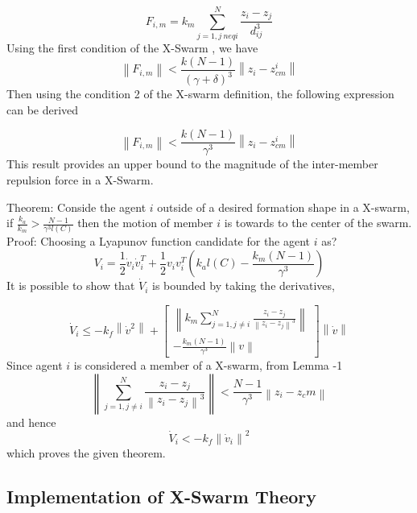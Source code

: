 \documentclass[twoside]{article}
\newcommand{\norm}[1]{\left\lVert#1\right\rVert}
\begin{document}
\begin{multicols}{2}
\begin{equation}
 F_{i,m} = k_m \sum_{j=1, j\ neq i}^{N} \frac{z_i - z_j}{d_{ij}^3} 
\end{equation}
Using the first condition of the X-Swarm , we have
\begin{equation}
 \norm{F_{i,m}} < \frac{k(N-1)}{(\gamma + \delta)^3} \norm{z_i - z_{cm}^i}
\end{equation}
Then using the condition 2 of the X-swarm definition, the following expression can be derived

\begin{equation}
 \norm{F_{i,m}} < \frac{k(N-1)}{\gamma^3} \norm{z_i - z_{cm}^i}
\end{equation}
		This result provides an upper bound to the magnitude of the inter-member repulsion force in a X-Swarm.  
		
		Theorem: Conside the agent $i$	outside of a desired formation shape in a X-swarm, if $\frac{k_a}{k_m} > \frac{N-1}{\gamma^3  l(C)}$ then the motion of member $i$ is towards to the center of the swarm. 
		Proof: Choosing a Lyapunov function candidate for the agent $i$ as?
		\begin{equation}
      V_i = \frac{1}{2} \dot{v}_i \dot{v}_i^T + \frac{1}{2} v_i v_i^T\left(k_al(C)-\frac{k_m(N-1)}{\gamma^3}\right) 
      		\end{equation}
			It is possible to show that $\dot{V}_i$ is bounded by taking the derivatives,
			
			\begin{equation}
\dot{V}_i \leq -k_f \norm{\dot{v}^2} + \begin{bmatrix}
\norm{k_m \sum_{j=1, j \neq i}^{N} \frac{z_i - z_j}{\norm{z_i - z_j}^3}} \\
- \frac{k_m(N-1)}{\gamma ^3} \norm{v}
\end{bmatrix} \norm{\dot{v}}
			\end{equation}
			Since agent $i$ is considered a member of a X-swarm, from Lemma -1
			\begin{equation}
\norm{ \sum_{j=1, j \neq i}^{N} \frac{z_i - z_j}{\norm{z_i - z_j}^3}} < \frac{N-1}{\gamma^3} \norm{z_i - z_cm}
			\end{equation}
			and hence
			\begin{equation}
\dot{V}_i < -k_f \norm{\dot{v}_i} ^2
			\end{equation}
			which proves the given theorem. 
\subsection{Implementation of X-Swarm Theory}			


\end{multicols}
\end{document}
